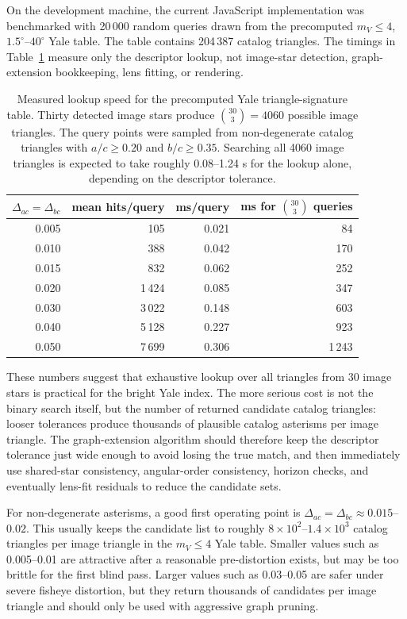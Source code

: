 \documentclass[11pt]{article}
\begin{document}
On the development machine, the current JavaScript implementation was
benchmarked with 20\,000 random queries drawn from the precomputed
\(m_V\le4\), \(1.5^\circ\)--\(40^\circ\) Yale table. The table contains
204\,387 catalog triangles. The timings in Table~\ref{tab:yale-index-speed}
measure only the descriptor lookup, not image-star detection, graph-extension
bookkeeping, lens fitting, or rendering.

\begin{table}[h]
\centering
\begin{tabular}{rrrr}
\toprule
\(\Delta_{ac}=\Delta_{bc}\) & mean hits/query & ms/query & ms for \(\binom{30}{3}\) queries \\
\midrule
0.005 & 105 & 0.021 & 84 \\
0.010 & 388 & 0.042 & 170 \\
0.015 & 832 & 0.062 & 252 \\
0.020 & 1\,424 & 0.085 & 347 \\
0.030 & 3\,022 & 0.148 & 603 \\
0.040 & 5\,128 & 0.227 & 923 \\
0.050 & 7\,699 & 0.306 & 1\,243 \\
\bottomrule
\end{tabular}
\caption{Measured lookup speed for the precomputed Yale triangle-signature
table. Thirty detected image stars produce \(\binom{30}{3}=4060\) possible
image triangles. The query points were sampled from non-degenerate catalog
triangles with \(a/c\ge0.20\) and \(b/c\ge0.35\). Searching all 4060 image
triangles is expected to take roughly 0.08--1.24 s for the lookup alone,
depending on the descriptor tolerance.}
\label{tab:yale-index-speed}
\end{table}

These numbers suggest that exhaustive lookup over all triangles from 30 image
stars is practical for the bright Yale index. The more serious cost is not the
binary search itself, but the number of returned candidate catalog triangles:
looser tolerances produce thousands of plausible catalog asterisms per image
triangle. The graph-extension algorithm should therefore keep the descriptor
tolerance just wide enough to avoid losing the true match, and then immediately
use shared-star consistency, angular-order consistency, horizon checks, and
eventually lens-fit residuals to reduce the candidate sets.

For non-degenerate asterisms, a good first operating point is
\(\Delta_{ac}=\Delta_{bc}\approx0.015\)--\(0.02\). This usually keeps the
candidate list to roughly \(8\times10^2\)--\(1.4\times10^3\) catalog triangles
per image triangle in the \(m_V\le4\) Yale table. Smaller values such as
0.005--0.01 are attractive after a reasonable pre-distortion exists, but may be
too brittle for the first blind pass. Larger values such as 0.03--0.05 are
safer under severe fisheye distortion, but they return thousands of candidates
per image triangle and should only be used with aggressive graph pruning.
\end{document}
